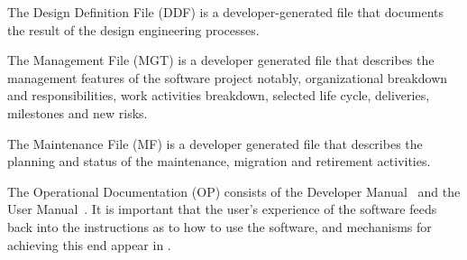 The Design Definition File (DDF) is a developer-generated file that
documents the result of the design engineering processes.


The Management File (MGT) is a developer generated file
that describes the management features of the software project notably,
organizational breakdown and responsibilities, work activities breakdown,
selected life cycle, deliveries, milestones and new risks.


The Maintenance File (MF) is a developer generated file
that describes the planning and status of the maintenance, migration and retirement activities.


The Operational Documentation (OP) consists of the Developer Manual~ and
the User Manual~. It is important that
the user's experience of the software feeds back into the instructions
as to how to use the software, and mechanisms for achieving this end appear
in .

% 
% 
% 
% 

